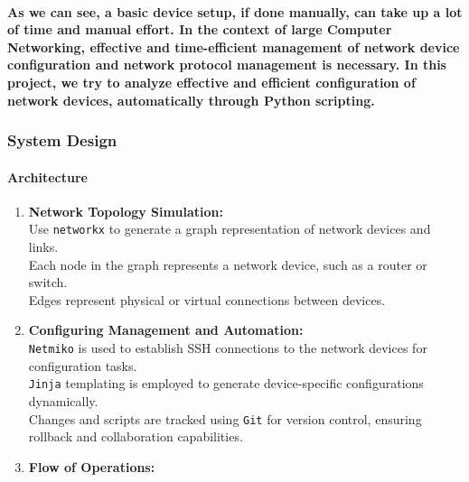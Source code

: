 \documentclass[11pt]{article}
\begin{document}
\hypertarget{as-we-can-see-a-basic-device-setup-if-done-manually-can-take-up-a-lot-of-time-and-manual-effort.-in-the-context-of-large-computer-networking-effective-and-time-efficient-management-of-network-device-configuration-and-network-protocol-management-is-necessary.-in-this-project-we-try-to-analyze-effective-and-efficient-configuration-of-network-devices-automatically-through-python-scripting.}{%
\paragraph{As we can see, a basic device setup, if done manually, can
take up a lot of time and manual effort. In the context of large
Computer Networking, effective and time-efficient management of network
device configuration and network protocol management is necessary. In
this project, we try to analyze effective and efficient configuration of
network devices, automatically through Python
scripting.}\label{as-we-can-see-a-basic-device-setup-if-done-manually-can-take-up-a-lot-of-time-and-manual-effort.-in-the-context-of-large-computer-networking-effective-and-time-efficient-management-of-network-device-configuration-and-network-protocol-management-is-necessary.-in-this-project-we-try-to-analyze-effective-and-efficient-configuration-of-network-devices-automatically-through-python-scripting.}}

    \hypertarget{system-design}{%
\subsubsection{System Design}\label{system-design}}

\hypertarget{architecture}{%
\paragraph{Architecture}\label{architecture}}

\begin{enumerate}
\def\labelenumi{\roman{enumi})}
\item
  \textbf{Network Topology Simulation:}\\
  Use \texttt{networkx} to generate a graph representation of network
  devices and links.\\
  Each node in the graph represents a network device, such as a router
  or switch.\\
  Edges represent physical or virtual connections between devices.
\item
  \textbf{Configuring Management and Automation:}\\
  \texttt{Netmiko} is used to establish SSH connections to the network
  devices for configuration tasks.\\
  \texttt{Jinja} templating is employed to generate device-specific
  configurations dynamically.\\
  Changes and scripts are tracked using \texttt{Git} for version
  control, ensuring rollback and collaboration capabilities.
\item
  \textbf{Flow of Operations:}\\
\end{enumerate}
\end{document}
